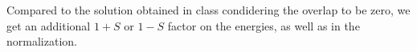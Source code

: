 \begin{questions}
\begin{solution}
Compared to the solution obtained in class condidering the overlap to be zero, we get an additional $1+S$ or $1-S$ factor on the energies, as well as in the normalization.
\end{solution}
\end{questions}
